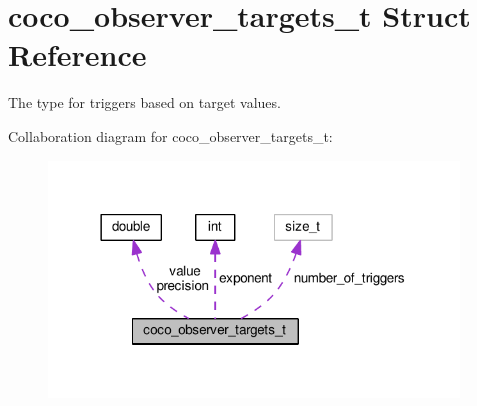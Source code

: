 \hypertarget{structcoco__observer__targets__t}{}\section{coco\+\_\+observer\+\_\+targets\+\_\+t Struct Reference}
\label{structcoco__observer__targets__t}


The type for triggers based on target values.  




Collaboration diagram for coco\+\_\+observer\+\_\+targets\+\_\+t\+:\nopagebreak
\begin{figure}[H]
\begin{center}
\leavevmode
\includegraphics[width=309pt]{structcoco__observer__targets__t__coll__graph}
\end{center}
\end{figure}

